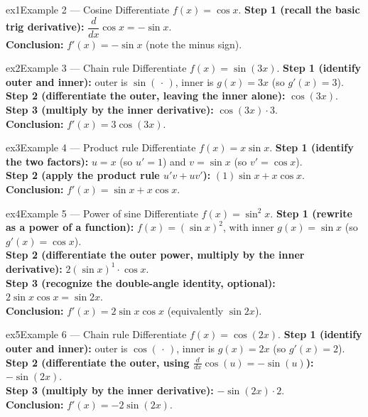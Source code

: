 \documentclass[11pt]{article}
\begin{document}
\begin{example}{ex1}{Example 2 --- Cosine}
Differentiate $f(x)=\cos x$.\soln
\textbf{Step 1 (recall the basic trig derivative):} $\dfrac{d}{dx}\cos x=-\sin x$.\\[3pt]
\textbf{Conclusion:} $f'(x)=-\sin x$ (note the minus sign).
\end{example}

\begin{example}{ex2}{Example 3 --- Chain rule}
Differentiate $f(x)=\sin(3x)$.\soln
\textbf{Step 1 (identify outer and inner):} outer is $\sin(\,\cdot\,)$, inner is $g(x)=3x$ (so $g'(x)=3$).\\[3pt]
\textbf{Step 2 (differentiate the outer, leaving the inner alone):} $\cos(3x)$.\\[3pt]
\textbf{Step 3 (multiply by the inner derivative):} $\cos(3x)\cdot3$.\\[3pt]
\textbf{Conclusion:} $f'(x)=3\cos(3x)$.
\end{example}

\begin{example}{ex3}{Example 4 --- Product rule}
Differentiate $f(x)=x\sin x$.\soln
\textbf{Step 1 (identify the two factors):} $u=x$ (so $u'=1$) and $v=\sin x$ (so $v'=\cos x$).\\[3pt]
\textbf{Step 2 (apply the product rule $u'v+uv'$):} $(1)\sin x+x\cos x$.\\[3pt]
\textbf{Conclusion:} $f'(x)=\sin x+x\cos x$.
\end{example}

\begin{example}{ex4}{Example 5 --- Power of sine}
Differentiate $f(x)=\sin^2 x$.\soln
\textbf{Step 1 (rewrite as a power of a function):} $f(x)=(\sin x)^2$, with inner $g(x)=\sin x$ (so $g'(x)=\cos x$).\\[3pt]
\textbf{Step 2 (differentiate the outer power, multiply by the inner derivative):} $2(\sin x)^1\cdot\cos x$.\\[3pt]
\textbf{Step 3 (recognize the double-angle identity, optional):} $2\sin x\cos x=\sin 2x$.\\[3pt]
\textbf{Conclusion:} $f'(x)=2\sin x\cos x$ (equivalently $\sin 2x$).
\end{example}

\begin{example}{ex5}{Example 6 --- Chain rule}
Differentiate $f(x)=\cos(2x)$.\soln
\textbf{Step 1 (identify outer and inner):} outer is $\cos(\,\cdot\,)$, inner is $g(x)=2x$ (so $g'(x)=2$).\\[3pt]
\textbf{Step 2 (differentiate the outer, using $\frac{d}{dx}\cos(u)=-\sin(u)$):} $-\sin(2x)$.\\[3pt]
\textbf{Step 3 (multiply by the inner derivative):} $-\sin(2x)\cdot2$.\\[3pt]
\textbf{Conclusion:} $f'(x)=-2\sin(2x)$.
\end{example}
\end{document}

